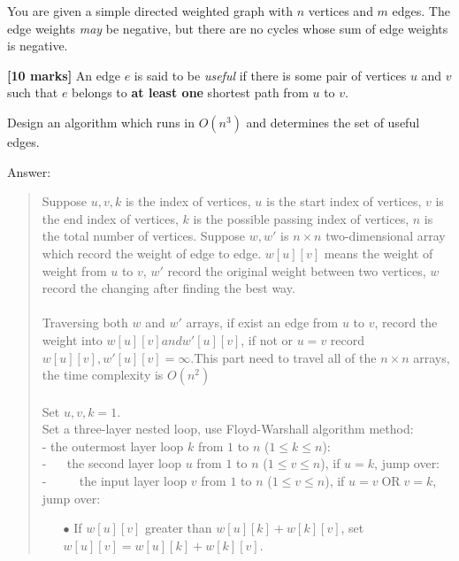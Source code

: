 \documentclass{article}
\DeclareMathOperator{\OR}{OR}
\begin{document}
\setcounter{question}{2}

\begin{Question}
You are given a simple directed weighted graph with $n$ vertices and $m$ edges. The edge weights \emph{may} be negative, but there are no cycles whose sum of edge weights is negative.

\begin{Subquestion}
\textbf{[10 marks]} An edge $e$ is said to be \textit{useful} if there is some pair of vertices $u$ and $v$ such that $e$ belongs to \textbf{at least one} shortest path from $u$ to $v$.

Design an algorithm which runs in $O(n^3)$ and determines the set of useful edges.\\

\begin{answer}
Answer:
\begin{quote}
    Suppose $u, v, k$ is the index of vertices, $u$ is the start index of vertices,  $v$ is the end index of vertices, $k$ is the possible passing index of vertices, $n$ is the total number of vertices. Suppose $w, w'$ is $n\times n$ two-dimensional array which record the weight of edge to edge. $w[u][v]$ means the weight of weight from $u$ to $v$, $w'$ record the original weight between two vertices, $w$ record the changing after finding the best way. \\\\
    Traversing both $w$ and $w'$ arrays, if exist an edge from $u$ to $v$, record the weight into $w[u][v] and w'[u][v]$, if not or $u=v$ record $w[u][v], w'[u][v] = \infty$.This part need to travel all of the $n\times n$ arrays, the time complexity is $O(n^2)$\\\\
    Set $u, v, k = 1$.\\
    Set a three-layer nested loop, use Floyd-Warshall algorithm method:\\
    - the outermost layer loop $k$ from $1$ to $n$ ($1\leq k \leq n$):\\
    - $\quad$ the second layer loop $u$ from $1$ to $n$ ($1\leq v \leq n$), if $u=k$, jump over:\\
    - $\quad \quad$ the input layer loop $v$ from $1$ to $n$ ($1\leq v \leq n$), if $u=v \OR v = k$, jump over:
    \begin{center}
        \begin{itemize}
            \item [$\bullet$] If $w[u][v]$ greater than $w[u][k] + w[k][v]$, set $w[u][v] = w[u][k] + w[k][v]$.

\end{itemize}
\end{center}
\end{quote}
\end{answer}
\end{Subquestion}
\end{Question}
\end{document}

